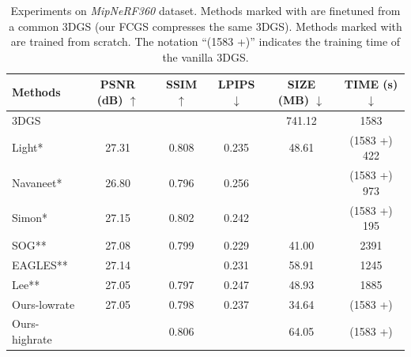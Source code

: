 \documentclass{article} %
\begin{document}
\begin{table}[h]
    \centering
    \caption{Experiments on \textit{MipNeRF360} dataset. Methods marked with \text{*} are finetuned from a common 3DGS (our FCGS compresses the same 3DGS). Methods marked with \text{**} are trained from scratch. The notation ``(1583 +)'' indicates the training time of the vanilla 3DGS. }
    \vspace{10pt}
    \begin{tabular}{lccccc}
        \toprule[2pt]
        \multicolumn{1}{l|}{Methods}        & PSNR (dB) $\uparrow$ & SSIM $\uparrow$ & \multicolumn{1}{c|}{LPIPS $\downarrow$} & \multicolumn{1}{c|}{SIZE (MB) $\downarrow$} & TIME (s) $\downarrow$ \\ \bottomrule
        \multicolumn{1}{l|}{3DGS} & \cellcolor{red!25}{27.52}     & \cellcolor{red!25}{0.813} & \multicolumn{1}{c|}{\cellcolor{red!25}{0.221}} & \multicolumn{1}{c|}{741.12}    & 1583     \\ \hline
        \multicolumn{1}{l|}{Light*}         & 27.31     & 0.808 & \multicolumn{1}{c|}{0.235} & \multicolumn{1}{c|}{48.61}     & (1583 +) 422      \\
        \multicolumn{1}{l|}{Navaneet*}      & 26.80     & 0.796 & \multicolumn{1}{c|}{0.256} & \multicolumn{1}{c|}{\cellcolor{red!25}{20.66}}     & (1583 +) 973      \\
        \multicolumn{1}{l|}{Simon*}         & 27.15     & 0.802 & \multicolumn{1}{c|}{0.242} & \multicolumn{1}{c|}{\cellcolor{yellow!25}{27.71}}     & (1583 +) 195      \\ \hline
        \multicolumn{1}{l|}{SOG**}          & 27.08     & 0.799 & \multicolumn{1}{c|}{0.229} & \multicolumn{1}{c|}{41.00}     & 2391     \\
        \multicolumn{1}{l|}{EAGLES**}       & 27.14     & \cellcolor{yellow!25}{0.809} & \multicolumn{1}{c|}{0.231} & \multicolumn{1}{c|}{58.91}     & 1245     \\
        \multicolumn{1}{l|}{Lee**}          & 27.05     & 0.797 & \multicolumn{1}{c|}{0.247} & \multicolumn{1}{c|}{48.93}     & 1885     \\ \hline
        \multicolumn{1}{l|}{Ours-lowrate}       & 27.05     & 0.798 & \multicolumn{1}{c|}{0.237} & \multicolumn{1}{c|}{34.64}     & (1583 +) \cellcolor{red!25}{10 / 31}         \\
        \multicolumn{1}{l|}{Ours-highrate}      & \cellcolor{yellow!25}{27.39}     & 0.806 & \multicolumn{1}{c|}{\cellcolor{yellow!25}{0.226}} & \multicolumn{1}{c|}{64.05}     & (1583 +) \cellcolor{yellow!25}{14 / 41}         \\ \bottomrule[2pt]
    \end{tabular}
    \label{tab:experiments_mip}
\end{table}
\end{document}
